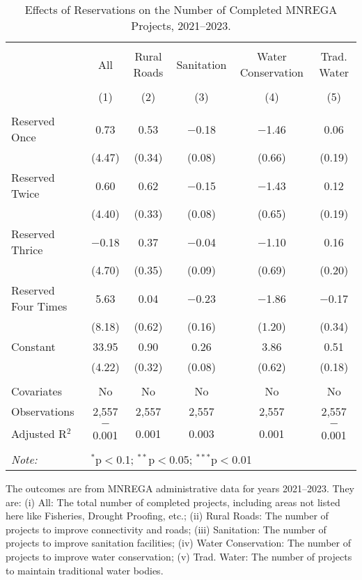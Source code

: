\begin{table}[!htbp]
\centering
\begin{threeparttable}

  \caption{Effects of Reservations on the Number of Completed MNREGA Projects, 2021--2023.} 
  \label{main_mnrega_2011_2023_dosage} 
\scriptsize 
\begin{tabular}{@{\extracolsep{0pt}}lccccc} 
\\[-1.8ex]\hline 
\hline \\[-1.8ex] 
 & All & Rural Roads & Sanitation & Water Conservation & Trad. Water \\ 
\\[-1.8ex] & (1) & (2) & (3) & (4) & (5)\\ 
\hline \\[-1.8ex] 
 Reserved Once & 0.73 & 0.53 & $-$0.18 & $-$1.46 & 0.06 \\ 
  & (4.47) & (0.34) & (0.08) & (0.66) & (0.19) \\ 
  Reserved Twice & 0.60 & 0.62 & $-$0.15 & $-$1.43 & 0.12 \\ 
  & (4.40) & (0.33) & (0.08) & (0.65) & (0.19) \\ 
  Reserved Thrice & $-$0.18 & 0.37 & $-$0.04 & $-$1.10 & 0.16 \\ 
  & (4.70) & (0.35) & (0.09) & (0.69) & (0.20) \\ 
  Reserved Four Times & 5.63 & 0.04 & $-$0.23 & $-$1.86 & $-$0.17 \\ 
  & (8.18) & (0.62) & (0.16) & (1.20) & (0.34) \\ 
  Constant & 33.95 & 0.90 & 0.26 & 3.86 & 0.51 \\ 
  & (4.22) & (0.32) & (0.08) & (0.62) & (0.18) \\ 
 \hline \\[-1.8ex] 
Covariates & No & No & No & No & No \\ 
Observations & 2,557 & 2,557 & 2,557 & 2,557 & 2,557 \\ 
Adjusted R$^{2}$ & $-$0.001 & 0.001 & 0.003 & 0.001 & $-$0.001 \\ 
\hline 
\hline \\[-1.8ex] 
\textit{Note:}  & \multicolumn{5}{l}{$^{*}$p$<$0.1; $^{**}$p$<$0.05; $^{***}$p$<$0.01} \\ 
\end{tabular} 
\begin{tablenotes}[flushleft]
\scriptsize
\item The outcomes are from MNREGA administrative data for years 2021--2023. They are: 
(i) All: The total number of completed projects, including areas not listed here like Fisheries, Drought Proofing, etc.;
(ii) Rural Roads: The number of projects to improve connectivity and roads;
(iii) Sanitation: The number of projects to improve sanitation facilities;
(iv) Water Conservation: The number of projects to improve water conservation;
(v) Trad. Water: The number of projects to maintain traditional water bodies.
\end{tablenotes}
\end{threeparttable}
\end{table}
